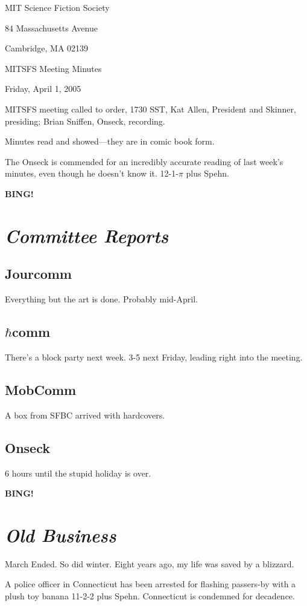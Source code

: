 \documentclass[10pt]{article}
\newcommand{\bing}{{\bf BING!} }
\newcommand{\goto}[1]{\bing \vskip 12pt \section*{{\em{#1}}}}
\newcommand{\ps}{ plus Spehn\xspace}
\begin{document}
\begin{center}

MIT Science Fiction Society

84 Massachusetts Avenue

Cambridge, MA 02139

\vspace{12pt}

MITSFS Meeting Minutes

Friday, April 1, 2005

\end{center}

\vspace{18pt}

\setlength{\parskip}{6pt}

\noindent
MITSFS meeting called to order, 1730 SST, Kat Allen, President and
Skinner, presiding; Brian Sniffen,  Onseck, recording.

Minutes read and showed---they are in comic book form.

The Onseck is commended for an incredibly accurate reading of last
week's minutes, even though he doesn't know it.  12-1-$\pi$\ps.

\goto{Committee Reports}
\subsection*{Jourcomm}
Everything but the art is done.  Probably mid-April.

\subsection*{$\hbar$comm}
There's a block party next week.  3-5 next Friday, leading right into
the meeting.

\subsection*{MobComm}
A box from SFBC arrived with hardcovers.

\subsection*{Onseck}
6 hours until the stupid holiday is over.

\goto{Old Business}
March Ended.  So did winter.  Eight years ago, my life was saved by a
blizzard.

A police officer in Connecticut has been arrested for flashing
passers-by with a plush toy banana 11-2-2\ps.  Connecticut is
condemned for decadence.
\end{document}

